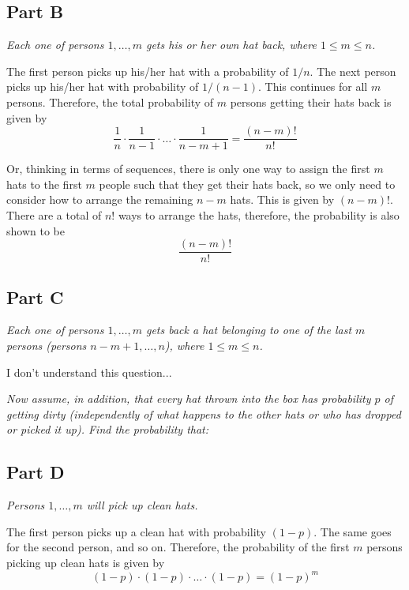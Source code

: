 \documentclass{article}
\begin{document}
\subsection*{Part B}

\textit{Each one of persons $ 1, \ldots, m $ gets his or her own hat back,
where $ 1 \leq m \leq n $.}

\bigbreak

The first person picks up his/her hat with a probability of $ 1 / n $. The
next person picks up his/her hat with probability of $ 1 / (n - 1) $. This
continues for all $ m $ persons. Therefore, the total probability of $ m $
persons getting their hats back is given by
$$ \frac{1}{n} \cdot \frac{1}{n - 1} \cdot \ldots \cdot \frac{1}{n - m + 1} =
\frac{(n - m)!}{n!} $$

Or, thinking in terms of sequences, there is only one way to assign the first
$ m $ hats to the first $ m $ people such that they get their hats back, so
we only need to consider how to arrange the remaining $ n - m $ hats. This is
given by $ (n - m)! $. There are a total of $ n! $ ways to arrange the hats,
therefore, the probability is also shown to be
$$ \frac{(n - m)!}{n!} $$

\subsection*{Part C}

\textit{Each one of persons $ 1, \ldots, m $ gets back a hat belonging to one
of the last $ m $ persons (persons $ n - m + 1, \ldots, n $), where $ 1 \leq 
m \leq n $.}

\bigbreak

I don't understand this question...

\bigbreak

\textit{Now assume, in addition, that every hat thrown into the box has
probability $ p $ of getting dirty (independently of what happens to the
other hats or who has dropped or picked it up). Find the probability that:}

\subsection*{Part D}

\textit{Persons $ 1, \ldots, m $ will pick up clean hats.}

\bigbreak

The first person picks up a clean hat with probability $ (1 - p) $. The same
goes for the second person, and so on. Therefore, the probability of the
first $ m $ persons picking up clean hats is given by
$$ (1 - p) \cdot (1 - p) \cdot \ldots \cdot (1 - p) = (1 - p)^m $$
\end{document}
